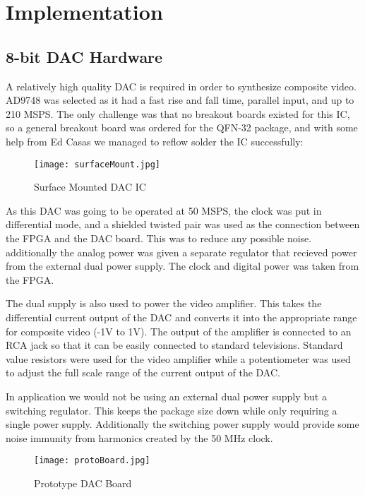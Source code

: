 \section{Implementation}

\subsection{8-bit DAC Hardware}

A relatively high quality DAC is required in order to synthesize composite
video. AD9748 was selected as it had a fast rise and fall time, parallel input,
and up to 210 MSPS. The only challenge was that no breakout boards existed for
this IC, so a general breakout board was ordered for the QFN-32 package, and
with some help from Ed Casas we managed to reflow solder the IC successfully:

\begin{figure}[H]
    \centering
    \texttt{[image: surfaceMount.jpg]}
    \caption{Surface Mounted DAC IC}
\end{figure}

As this DAC was going to be operated at 50 MSPS, the clock was put in
differential mode, and a shielded twisted pair was used as the connection
between the FPGA and the DAC board. This was to reduce any possible noise.
additionally the analog power was given a separate regulator that recieved
power from the external dual power supply. The clock and digital power was taken
from the FPGA.

The dual supply is also used to power the video amplifier. This takes the
differential current output of the DAC and converts it into the appropriate
range for composite video (-1V to 1V). The output of the amplifier is connected
to an RCA jack so that it can be easily connected to standard televisions.
Standard value resistors were used for the video amplifier while a potentiometer
was used to adjust the full scale range of the current output of the DAC.

In application we would not be using an external dual power supply but a switching
regulator. This keeps the package size down while only requiring a single power
supply. Additionally the switching power supply would provide some noise
immunity from harmonics created by the 50 MHz clock.

\begin{figure}[H]
    \centering
    \texttt{[image: protoBoard.jpg]}
    \caption{Prototype DAC Board}
\end{figure}

